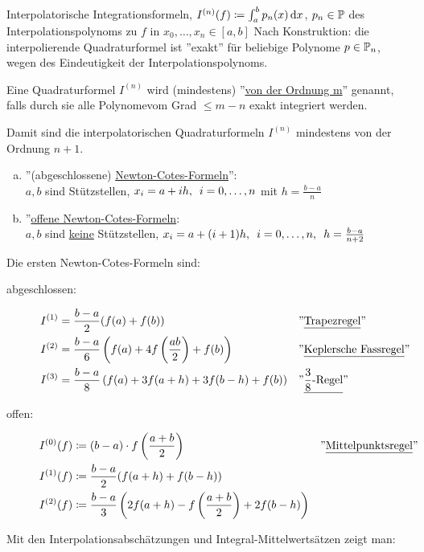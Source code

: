 \documentclass[../Skript.tex]{subfiles}
\begin{document}
Interpolatorische Integrationsformeln, \(I^{(n)}
(f)\coloneqq\int^b_ap_n(x)\mathop{}\!\mathrm{d} 
x\), \( p_n\in\mathbb{P}\) des Interpolationspolynoms zu \(f\) in  
\(x_0,\dots,x_n
\in[a,b]\) Nach Konstruktion: die interpolierende Quadraturformel ist 
''exakt'' 
für beliebige Polynome \(p\in\mathbb{P}_n\), wegen des Eindeutigkeit der 
Interpolationspolynoms.
\begin{definition}
    Eine Quadraturformel \(I^{(n)}\) wird (mindestens) ''\underline{von 
    der 
    Ordnung m}'' genannt, falls durch sie alle Polynomevom Grad \(\leq 
    m-n\) 
    exakt integriert werden.
\end{definition}
Damit sind die interpolatorischen Quadraturformeln \(I^{(n)}\) 
mindestens von der 
Ordnung \(n+1\).

\begin{example}\hfill
\begin{enumerate}[(a)]
    \item ''(abgeschlossene) \underline{Newton-Cotes-Formeln}'':\\
    $a,b$ sind Stützstellen, $x_i=a+ih,\midspace \igb i 0 n$ mit 
    $h=\frac{b-a}{n}$
    \item ''\underline{offene Newton-Cotes-Formeln}:\\
    $a,b$ sind \underline{keine} Stützstellen, $x_i = a+(i+1)h,\midspace
    \igb i 0 
    n, \midspace h=\frac{b-a}{n+2}$
\end{enumerate}
Die ersten Newton-Cotes-Formeln sind:
\begin{description}
\item[abgeschlossen:]\begin{align*}
    I^{(1)} &= \frac{b-a}{2}(f(a) + f(b)) && 
    \text{''\underline{Trapezregel}''}\\
    I^{(2)} &= \frac{b-a}{6}\left(f(a) + 4f\left(\frac{ab}{2}\right) + 
    f(b)\right) && \text{''\underline{Keplersche Fassregel}''}\\
    I^{(3)} &= \frac{b-a}{8}\left(f(a) + 3f(a+h) + 3f(b-h) + f(b)\right)
    && 
    \text{''\underline{$\frac{3}{8}$-Regel}''}
\end{align*}    
\item[offen:]\begin{align*}
    I^{(0)}(f) &\coloneqq (b-a) \cdot f\left(\frac{a+b}{2}\right) && 
    \text{''\underline{Mittelpunktsregel}''}\\
    I^{(1)}(f) &\coloneqq \frac{b-a}{2}(f(a+h) + f(b-h))\\
    I^{(2)}(f) &\coloneqq \frac{b-a}{3}\left(2f(a+h) - f\left(\frac{a+b}
    {2}\right) + 2f(b-h)\right)  
\end{align*}

\end{description}
\end{example}
Mit den Interpolationsabschätzungen und Integral-Mittelwertsätzen zeigt 
man:
\end{document}
